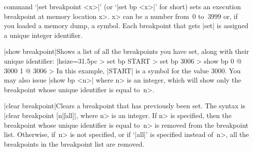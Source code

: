 command `|set breakpoint <x>|' (or `|set bp <x>|' for short) sets
an execution breakpoint at memory location \<x>. \<x> can be a
number from~$0$ to~$3999$ or, if you loaded a memory dump, a symbol.
Each breakpoint that gets |set| is assigned a unique integer identifier.
\smallskip
\item{|show breakpoint|}Shows a list of all the breakpoints you have
set, along with their unique identifier:
\begintt|hsize=31.5pc
> set bp START
> set bp 3006
> show bp
0 @ 3000
1 @ 3006
>
\endtt
In this example, |START| is a symbol for the value $3000$. You may
also issue |show bp <n>| where \<n> is an integer, which will show
only the breakpoint whose unique identifier is equal to~\<n>.
\smallskip
\item{|clear breakpoint|}Clears a breakpoint that has previously been
set. The syntax is |clear breakpoint [n|\||all]|, where \<n> is an
integer. If \<n> is specified, then the breakpoint whose unique
identifier is equal to~\<n> is removed from the breakpoint list.
Otherwise, if~\<n> is not specified, or if `|all|' is specified
instead of~\<n>, all the breakpoints in the breakpoint list
are removed.

